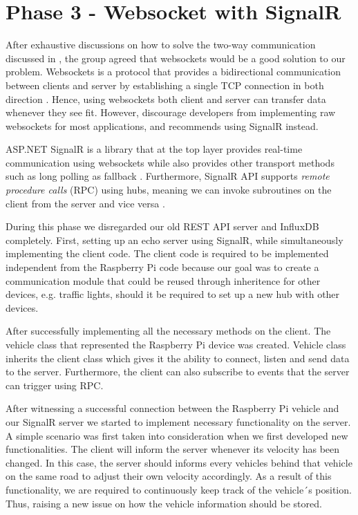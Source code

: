 \section{Phase 3 - Websocket with SignalR}\label{phase3}
After exhaustive discussions on how to solve the two-way communication discussed in , the group agreed that websockets would be a good solution to our problem. Websockets is a protocol that provides a bidirectional communication between clients and server by establishing a single TCP connection in both direction \parencite{rfc_websockets}. Hence, using websockets both client and server can transfer data whenever they see fit. However, \cite{microsoft_websockets} discourage developers from implementing raw websockets for most applications, and recommends using SignalR instead.

ASP.NET SignalR is a library that at the top layer provides real-time communication using websockets while also provides other transport methods such as long polling as fallback \parencite{microsoft_signalr}. Furthermore, SignalR API supports \emph{remote procedure calls} (RPC) using hubs, meaning we can invoke subroutines on the client from the server and vice versa \parencite{microsoft_signalr}.

During this phase we disregarded our old REST API server and InfluxDB completely. First, setting up an echo server using SignalR, while simultaneously implementing the client code. The client code is required to be implemented independent from the Raspberry Pi code because our goal was to create a communication module that could be reused through inheritence for other devices, e.g. traffic lights, should it be required to set up a new hub with other devices.

After successfully implementing all the necessary methods on the client. The vehicle class that represented the Raspberry Pi device was created. Vehicle class inherits the client class which gives it the ability to connect, listen and send data to the server. Furthermore, the client can also subscribe to events that the server can trigger using RPC.

After witnessing a successful connection between the Raspberry Pi vehicle and our SignalR server we started to implement necessary functionality on the server. A simple scenario was first taken into consideration when we first developed new functionalities. The client will inform the server whenever its velocity has been changed. In this case, the server should informs every vehicles behind that vehicle on the same road to adjust their own velocity accordingly. As a result of this functionality, we are required to continuously keep track of the vehicle´s position. Thus, raising a new issue on how the vehicle information should be stored.

